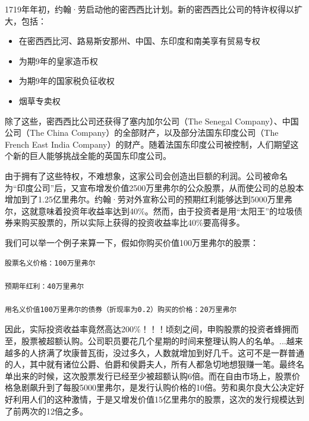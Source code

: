 \documentclass[12pt,oneside]{book}
\begin{document}
\begin{mdframed}
1719年年初，约翰·劳启动他的密西西比计划。新的密西西比公司的特许权得以扩大，包括：

\begin{itemize}
\item 在密西西比河、路易斯安那州、中国、东印度和南美享有贸易专权
\item 为期9年的皇家造币权
\item 为期9年的国家税负征收权
\item 烟草专卖权
\end{itemize}


除了这些，密西西比公司还获得了塞内加尔公司（The Senegal Company）、中国公司（The China Company）的全部财产，以及部分法国东印度公司（The French East India Company）的财产。随着法国东印度公司被控制，人们期望这个新的巨人能够挑战全能的英国东印度公司。

由于拥有了这些特权，不难想象，这家公司会创造出巨额的利润。公司被命名为“印度公司”后，又宣布增发价值2500万里弗尔的公众股票，从而使公司的总股本增加到了1.25亿里弗尔。约翰·劳对外宣称公司的预期红利能够达到5000万里弗尔，这就意味着投资年收益率达到40\%。然而，由于投资者是用“太阳王”的垃圾债券来购买股票的，所以实际上获得的投资收益率比40\%要高得多。

我们可以举一个例子来算一下，假如你购买价值100万里弗尔的股票：
\begin{Verbatim}
股票名义价格：100万里弗尔

预期年红利：40万里弗尔

用名义价值100万里弗尔的债券（折现率为0.2）购买的价格：20万里弗尔
\end{Verbatim}

因此，实际投资收益率竟然高达200\%！！！顷刻之间，申购股票的投资者蜂拥而至，股票被超额认购。公司职员要花几个星期的时间来整理认购人的名单。...越来越多的人挤满了坎康普瓦街，没过多久，人数就增加到好几千。这可不是一群普通的人，其中就有诸位公爵、伯爵和侯爵夫人，所有人都急切地想狠赚一笔。最终名单出来的时候，这次股票发行已经至少被超额认购6倍。而在自由市场上，股票价格急剧飙升到了每股5000里弗尔，是发行认购价格的10倍。劳和奥尔良大公决定好好利用人们的这种激情，于是又增发价值15亿里弗尔的股票，这次的发行规模达到了前两次的12倍之多。

\end{mdframed}
\end{document}
